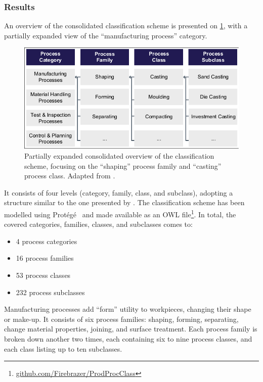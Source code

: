 \subsubsection*{Results}
An overview of the consolidated classification scheme is presented on \cref{fig:clsfScheme}, with a partially expanded view of the ``manufacturing process'' category.
\begin{figure}[tb]
  \centering
  \includegraphics[width=.7\textwidth, trim=2 2 2 2, clip]{mainmatter/researchResults/figures/clsfScheme.pdf}
  \caption[Partially expanded overview of the consolidated classification scheme.]
  {Partially expanded consolidated overview of the classification scheme, focusing on the ``shaping'' process family and ``casting'' process class.
  Adapted from \parencite{SorensenCMS2018}.}\label{fig:clsfScheme}
\end{figure}
It consists of four levels (category, family, class, and subclass), adopting a structure similar to the one presented by \textcite{Ashby2011}.
The classification scheme has been modelled using Protégé~\parencite{Musen2015} and made available as an OWL file\footnote{\href{https://github.com/Firebrazer/ProdProcClass}{github.com/Firebrazer/ProdProcClass}}.
In total, the covered categories, families, classes, and subclasses comes to:
\begin{itemize}
  \item 4 process categories
  \item 16 process families
  \item 53 process classes
  \item 232 process subclasses
\end{itemize}

Manufacturing processes add ``form'' utility to workpieces, changing their shape or make-up.
It consists of six process families: shaping, forming, separating, change material properties, joining, and surface treatment.
Each process family is broken down another two times, each containing six to nine process classes, and each class listing up to ten subclasses.

